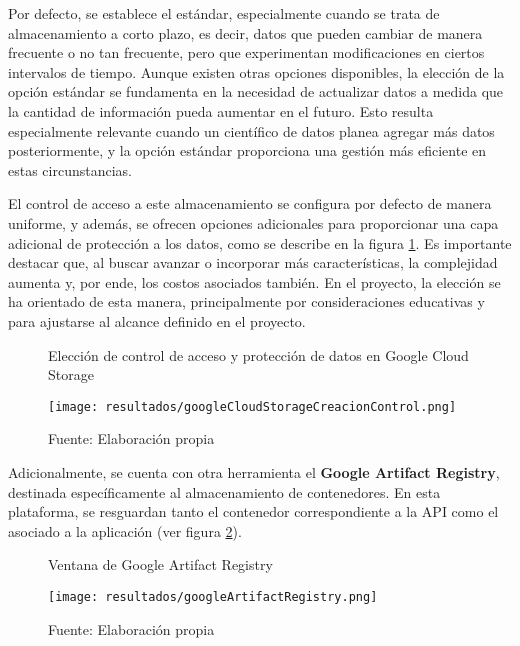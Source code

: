 Por defecto, se establece el estándar, especialmente cuando se trata de almacenamiento a corto plazo, es decir, datos que pueden cambiar de manera frecuente o no tan frecuente, pero que experimentan modificaciones en ciertos intervalos de tiempo. Aunque existen otras opciones disponibles, la elección de la opción estándar se fundamenta en la necesidad de actualizar datos a medida que la cantidad de información pueda aumentar en el futuro. Esto resulta especialmente relevante cuando un científico de datos planea agregar más datos posteriormente, y la opción estándar proporciona una gestión más eficiente en estas circunstancias. \newline

El control de acceso a este almacenamiento se configura por defecto de manera uniforme, y además, se ofrecen opciones adicionales para proporcionar una capa adicional de protección a los datos, como se describe en la figura \ref{fig:figuraGoogleCloudStorageCreacionControl}. Es importante destacar que, al buscar avanzar o incorporar más características, la complejidad aumenta y, por ende, los costos asociados también. En el proyecto, la elección se ha orientado de esta manera, principalmente por consideraciones educativas y para ajustarse al alcance definido en el proyecto.

\newpage

\begin{figure}[h]
	\centering
	\caption{Elección de control de acceso y protección de datos en Google Cloud Storage}
	\texttt{[image: resultados/googleCloudStorageCreacionControl.png]}
	\caption*{\footnotesize Fuente: Elaboración propia}
	\label{fig:figuraGoogleCloudStorageCreacionControl}
\end{figure}

Adicionalmente, se cuenta con otra herramienta el \textbf{Google Artifact Registry}, destinada específicamente al almacenamiento de contenedores. En esta plataforma, se resguardan tanto el contenedor correspondiente a la API como el asociado a la aplicación (ver figura \ref{fig:figuraGoogleArtifactRegistry}).

\newpage

\begin{figure}[h]
	\centering
	\caption{Ventana de Google Artifact Registry}
	\texttt{[image: resultados/googleArtifactRegistry.png]}
	\caption*{\footnotesize Fuente: Elaboración propia}
	\label{fig:figuraGoogleArtifactRegistry}
\end{figure}

